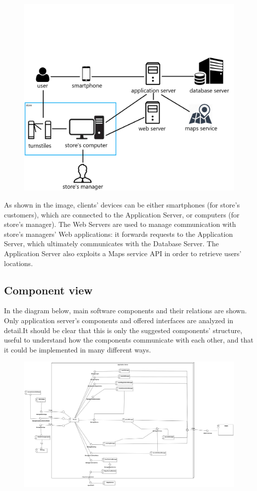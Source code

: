 \documentclass{article}
\begin{document}
\smallskip\\
\begin{figure}[H]
  \includegraphics[width=\linewidth]{highArchitecture.png}
  
\end{figure}
As shown in the image, clients’ devices can be either smartphones (for store’s customers), which are connected to the Application Server, or computers (for store’s manager). The Web Servers are used to manage communication with store’s managers’ Web applications: it forwards requests to the Application Server, which ultimately communicates with the Database Server. The Application Server also exploits a Maps service API in order to retrieve users’ locations.
\subsection{Component view}
In the diagram below, main software components and their relations are shown. Only application server's
components and offered interfaces are analyzed in detail.It should be clear that this is only the
suggested components' structure, useful to understand how the components communicate with each other,
and that it could be implemented in many different ways.
\begin{figure}[H]
  \includegraphics[width=\linewidth]{ComponentDiagram.png}
  
\end{figure}
\end{document}
